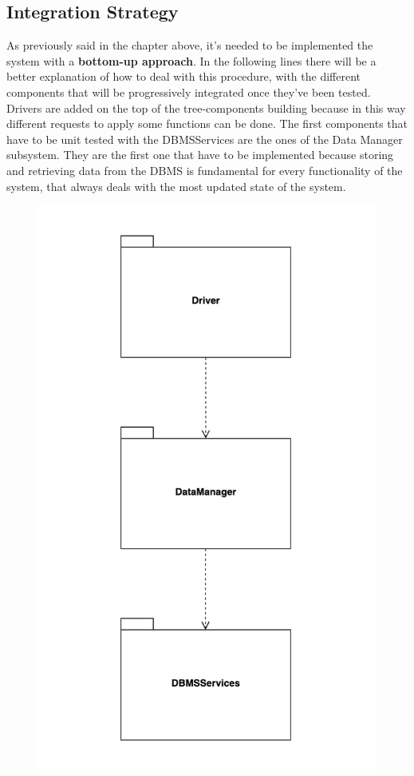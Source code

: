 \documentclass[]{article}
\begin{document}
				\subsection{Integration Strategy}
				\medskip
As previously said in the chapter above, it’s needed to be implemented the system with a \textbf{bottom-up approach}. In the following lines there will be a better explanation of how to deal with this procedure, with the different components that will be progressively integrated once they’ve been tested. Drivers are added on the top of the tree-components building because in this way different requests to apply some functions can be done.
\noindent
The first components that have to be unit tested with the DBMSServices are the ones of the Data Manager subsystem. They are the first one that have to be implemented because storing and retrieving data from the DBMS is fundamental for every functionality of the system, that always deals with the most updated state of the system. 
				\begin{figure}[H]
					\centering
					\includegraphics[scale=0.7]{Testing/Testing1.png}
					\caption{}
					\label{fig:Testing}
				\end{figure}
\end{document}
